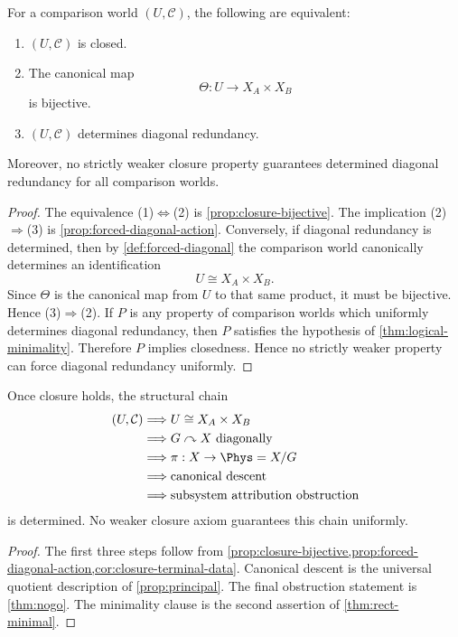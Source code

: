 \begin{theorem}
	\label{thm:rect-minimal}
	For a comparison world \((U,\mathcal C)\), the following are equivalent:
	\begin{enumerate}[label=\textup{(\arabic*)}]
		\item \((U,\mathcal C)\) is closed.
		\item The canonical map
		      \[
			      \Theta:U\to X_A\times X_B
		      \]
		      is bijective.
		\item \((U,\mathcal C)\) determines diagonal redundancy.
	\end{enumerate}
	Moreover, no strictly weaker closure property guarantees determined diagonal
	redundancy for all comparison worlds.
\end{theorem}
\begin{proof}
	The equivalence
	\textup{(1)}\(\Longleftrightarrow\)\textup{(2)} is
	\cref{prop:closure-bijective}. The implication
	\textup{(2)}\(\Longrightarrow\)\textup{(3)} is
	\cref{prop:forced-diagonal-action}. Conversely, if diagonal redundancy is
	determined, then by \cref{def:forced-diagonal} the comparison world
	canonically determines an identification
	\[
		U\cong X_A\times X_B.
	\]
	Since \(\Theta\) is the canonical map from \(U\) to that same product,
	it must be bijective. Hence
	\textup{(3)}\(\Longrightarrow\)\textup{(2)}.
	If \(P\) is any property of comparison worlds which uniformly determines
	diagonal redundancy, then \(P\) satisfies the hypothesis of
	\cref{thm:logical-minimality}. Therefore \(P\) implies closedness. Hence
	no strictly weaker property can force diagonal redundancy uniformly.
\end{proof}
\begin{corollary}
	Once closure holds, the structural chain
	\begin{align*}
		(U,\mathcal C)
		 & \Longrightarrow U\cong X_A\times X_B                     \\
		 & \Longrightarrow G\curvearrowright X \text{ diagonally}   \\
		 & \Longrightarrow \pi:X\to\Phys=X/G                        \\
		 & \Longrightarrow \text{canonical descent}                    \\
		 & \Longrightarrow \text{subsystem attribution obstruction}
	\end{align*}
	is determined. No weaker closure axiom guarantees this chain uniformly.
\end{corollary}
\begin{proof}
	The first three steps follow from
	\cref{prop:closure-bijective,prop:forced-diagonal-action,cor:closure-terminal-data}.
	Canonical descent is the universal quotient description of
	\cref{prop:principal}. The final obstruction statement is
	\cref{thm:nogo}. The minimality clause is the second assertion of
	\cref{thm:rect-minimal}.
\end{proof}
